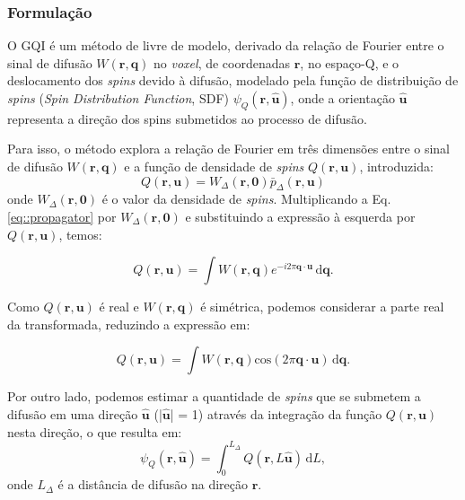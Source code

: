 \documentclass[
    12pt,                %
    oneside,            %
    a4paper,            %
    english,            %
    french,                %
    spanish,            %
    brazil                %
    ]{abntex2}
\begin{document}
\subsubsection{Formulação}
\label{ssec::gqi_formulacao}

O GQI é um método de livre de modelo, derivado da relação de Fourier entre o sinal de difusão $W(\mathbf{r},\mathbf{q})$ no \textit{voxel}, de coordenadas $\mathbf{r}$, no espaço-Q, e o deslocamento dos \textit{spins} devido à difusão, modelado pela função de distribuição de \textit{spins} (\textit{Spin Distribution Function}, SDF) $\psi_Q(\mathbf{r}, \mathbf{\hat{u}})$, onde a orientação $\mathbf{\hat{u}}$ representa a direção dos spins submetidos ao processo de difusão. %

Para isso, o método explora a relação de Fourier em três dimensões entre o sinal de difusão $W(\mathbf{r}, \mathbf{q})$ e a função de densidade de \textit{spins} $Q(\mathbf{r}, \mathbf{u})$, introduzida:
\begin{equation}
\label{eq::spin_densidade_presentacao}
    Q(\mathbf{r}, \mathbf{u}) = W_{\Delta}(\mathbf{r}, \mathbf{0}) \bar{p}_{\Delta}(\mathbf{r}, \mathbf{u})
\end{equation}
onde $W_{\Delta}(\mathbf{r}, \mathbf{0})$ é o valor da densidade de \textit{spins}. Multiplicando a Eq. \ref{eq::propagator} por  $W_{\Delta}(\mathbf{r}, \mathbf{0})$ e substituindo a expressão à esquerda por $Q(\mathbf{r}, \mathbf{u})$, temos:


\begin{equation}
\label{eq::spin_diffsignal_1}
    Q(\mathbf{r}, \mathbf{u}) =
    \int \! W(\mathbf{r}, \mathbf{q})e^{-i2\pi \mathbf{q}\cdot \mathbf{u} } \,\mathrm{d}\mathbf{q} .
\end{equation}

Como $Q(\mathbf{r}, \mathbf{u})$ é real e $W(\mathbf{r}, \mathbf{q})$ é simétrica, podemos considerar a parte real da transformada, reduzindo a expressão em:

\begin{equation}
\label{eq::spin_diffsignal_2}
    Q(\mathbf{r}, \mathbf{u}) =
     \int \! W(\mathbf{r}, \mathbf{q})\text{cos}(2\pi \mathbf{q}\cdot \mathbf{u}) \,\mathrm{d}\mathbf{q} .
\end{equation}

Por outro lado, podemos estimar a quantidade de \textit{spins} que se submetem a difusão em uma direção $\mathbf{\hat{u}}$ (|$\mathbf{\hat{u}}$| = 1) através da integração da função $Q(\mathbf{r}, \mathbf{u})$ nesta direção, o que resulta em:
\begin{equation}
\label{eq::sdf_spin}
    \psi_Q(\mathbf{r}, \mathbf{\hat{u}}) =
   \int_{0}^{L_{\Delta}} Q(\mathbf{r}, L\mathbf{\hat{u}})\!  \,\mathrm{d}L , 
\end{equation}
onde $L_\Delta$ é a distância de difusão na direção  $\mathbf{r}$.
\end{document}
